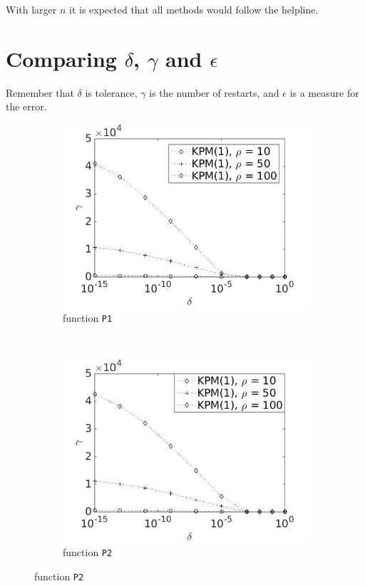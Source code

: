 With larger $n$ it is expected that all methods would follow the helpline.
\section{Comparing $\delta$, $\gamma$ and $\epsilon$ } \label{sec:div}
Remember that $\delta$ is tolerance, $\gamma$ is the number of restarts, and $\epsilon$ is a measure for the error.
\begin{figure}[H]
        \centering
        \begin{subfigure}[b]{0.45\textwidth}
                \includegraphics[width=\textwidth]{fig/s13antvstol1m}
                \caption{function \texttt{P1}}
                \label{fig:gammadelta1}
        \end{subfigure}
~
        \begin{subfigure}[b]{0.45\textwidth}
                \includegraphics[width=\textwidth]{fig/s14antvstol2m}
                \caption{ function \texttt{P2}}
                \label{fig:gammadelta2}
        \end{subfigure}
        

\end{figure}
